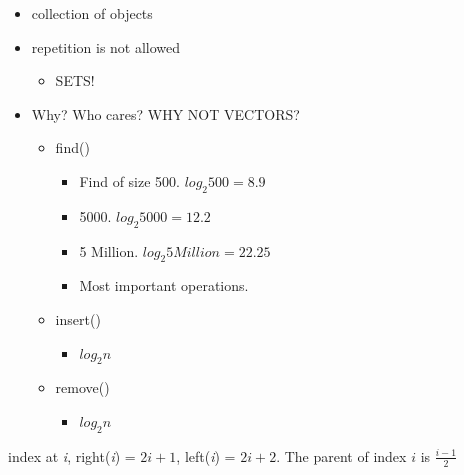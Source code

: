 \documentclass{article}
\begin{document}
\begin{itemize}
\item collection of objects
\item repetition is not allowed
    \begin{itemize}
    \item SETS!
    \end{itemize}
\item Why? Who cares? WHY NOT VECTORS?
    \begin{itemize}
    \item find()
        \begin{itemize}
        \item Find of size 500. $log_2 500 = 8.9$
        \item 5000. $log_2 5000 = 12.2$
        \item 5 Million. $log_2 5 Million = 22.25$
        \item Most important operations.
        \end{itemize}
    \item insert()
        \begin{itemize}
        \item $log_2 n$
        \end{itemize}
    \item remove()
        \begin{itemize}
        \item $log_2 n$
        \end{itemize}
    \end{itemize}
\end{itemize}

index at \textit{i}, right(\textit{i}) = $2i + 1$, left(\textit{i}) = $2i + 2$. The parent of index $i$ is $\frac{i - 1}{2}$
\end{document}

